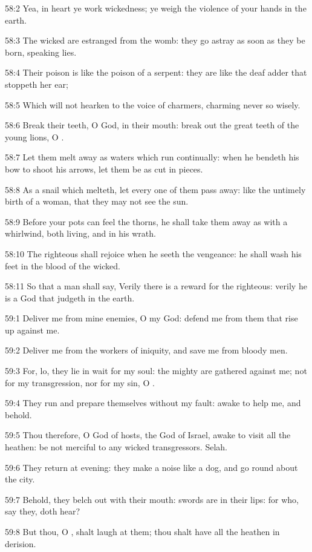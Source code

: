 58:2 Yea, in heart ye work wickedness; ye weigh the violence of your
hands in the earth.

58:3 The wicked are estranged from the womb: they go astray as soon as
they be born, speaking lies.

58:4 Their poison is like the poison of a serpent: they are like the
deaf adder that stoppeth her ear;

58:5 Which will not hearken to the voice of charmers, charming never
so wisely.

58:6 Break their teeth, O God, in their mouth: break out the great
teeth of the young lions, O \LORD.

58:7 Let them melt away as waters which run continually: when he
bendeth his bow to shoot his arrows, let them be as cut in pieces.

58:8 As a snail which melteth, let every one of them pass away: like
the untimely birth of a woman, that they may not see the sun.

58:9 Before your pots can feel the thorns, he shall take them away as
with a whirlwind, both living, and in his wrath.

58:10 The righteous shall rejoice when he seeth the vengeance: he
shall wash his feet in the blood of the wicked.

58:11 So that a man shall say, Verily there is a reward for the
righteous: verily he is a God that judgeth in the earth.



59:1 Deliver me from mine enemies, O my God: defend me from them that
rise up against me.

59:2 Deliver me from the workers of iniquity, and save me from bloody
men.

59:3 For, lo, they lie in wait for my soul: the mighty are gathered
against me; not for my transgression, nor for my sin, O \LORD.

59:4 They run and prepare themselves without my fault: awake to help
me, and behold.

59:5 Thou therefore, O \LORD God of hosts, the God of Israel, awake to
visit all the heathen: be not merciful to any wicked transgressors.
Selah.

59:6 They return at evening: they make a noise like a dog, and go
round about the city.

59:7 Behold, they belch out with their mouth: swords are in their
lips: for who, say they, doth hear?

59:8 But thou, O \LORD, shalt laugh at them; thou shalt have all the
heathen in derision.

